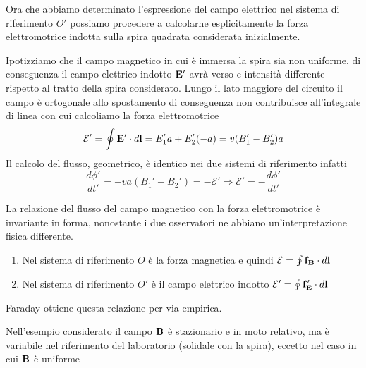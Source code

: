 
Ora che abbiamo determinato l'espressione del campo elettrico nel sistema di riferimento $O'$ possiamo procedere a calcolarne esplicitamente la forza elettromotrice indotta sulla spira quadrata considerata inizialmente.

Ipotizziamo che il campo magnetico in cui \`e immersa la spira sia non uniforme, di conseguenza il campo elettrico indotto $\bold{E}'$ avr\`a  verso e intensit\`a  differente rispetto al tratto della spira considerato. Lungo il lato maggiore del circuito il campo \`e ortogonale allo spostamento di conseguenza non contribuisce all'integrale di linea con cui calcoliamo la forza elettromotrice 
\begin{equation*}
	\mathcal{E}' = \oint \bold{E}' \cdot d\bold{l} = E_1'a  + E_2'(-a) = v(B_1' - B_2')a
\end{equation*}
Il calcolo del flusso, geometrico, \`e identico nei due sistemi di riferimento infatti 
\begin{equation*}
	\frac{d \phi '}{dt'} = - va(B_1'-B_2') = - \mathcal{E}' \Rightarrow \mathcal{E}' = - \frac{d\phi'}{dt'}
\end{equation*} 

La relazione del flusso del campo magnetico con la forza elettromotrice \`e  invariante in forma, nonostante i due osservatori ne abbiano un'interpretazione fisica differente.
\begin{enumerate}
	\item Nel sistema di riferimento $O$ \`e la forza magnetica e quindi $\mathcal{E}= \oint \bold{f_B} \cdot d \bold{l} $ 
	\item Nel sistema di riferimento $O'$ \`e il campo elettrico indotto $\mathcal{E}' = \oint \bold{f_E'} \cdot d \bold{l}$
\end{enumerate}
\begin{center}
 \end{center}
 Faraday ottiene questa relazione per via empirica. 
\begin{remark}

 Nell'esempio considerato il campo $\bold{B}$ \`e stazionario e in moto relativo, ma \`e variabile nel riferimento del laboratorio (solidale con la spira), eccetto nel caso in cui $\bold{B}$ \`e uniforme 
\end{remark}

